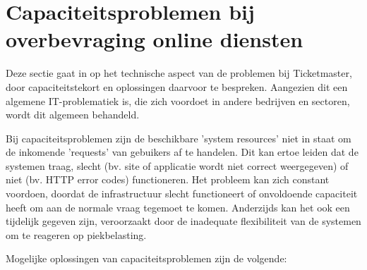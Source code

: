 
\section{Capaciteitsproblemen bij overbevraging online diensten}

Deze sectie gaat in op het technische aspect van de problemen bij Ticketmaster,
door capaciteitstekort en oplossingen daarvoor te bespreken. Aangezien dit
een algemene IT-problematiek is, die zich voordoet in andere bedrijven en
sectoren, wordt dit algemeen behandeld. 


Bij capaciteitsproblemen zijn de beschikbare 'system resources'
niet in staat om de inkomende 'requests' van gebuikers af te handelen.
Dit kan ertoe leiden dat de systemen traag, slecht (bv. site of applicatie wordt niet correct
weergegeven) of niet (bv. HTTP error codes) functioneren.
Het probleem kan zich constant voordoen, doordat de infrastructuur slecht
functioneert of onvoldoende capaciteit heeft om aan de normale
vraag tegemoet te komen. Anderzijds kan het ook een tijdelijk gegeven zijn,
veroorzaakt door de inadequate flexibiliteit van de systemen om
te reageren op piekbelasting. \newline

Mogelijke oplossingen van capaciteitsproblemen zijn de volgende:

